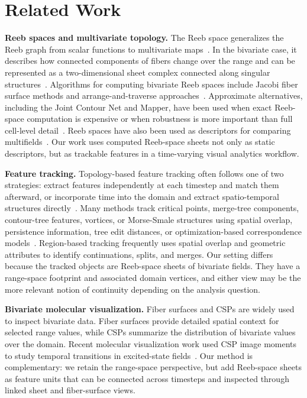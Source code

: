 \documentclass{vgtc}
\newcommand{\myparagraph}[1]{\vspace{1mm} \noindent \textbf{#1}}
\begin{document}
\section{Related Work}

\myparagraph{Reeb spaces and multivariate topology.}
The Reeb space generalizes the Reeb graph from scalar functions to multivariate maps~\cite{Edelsbrunner2008}. In the bivariate case, it describes how connected components of fibers change over the range and can be represented as a two-dimensional sheet complex connected along singular structures~\cite{Edelsbrunner2004b}. Algorithms for computing bivariate Reeb spaces include Jacobi fiber surface methods and arrange-and-traverse approaches~\cite{Tierny2017,Hristov2026SingularAA}. Approximate alternatives, including the Joint Contour Net and Mapper, have been used when exact Reeb-space computation is expensive or when robustness is more important than full cell-level detail~\cite{Carr2014,Dey2016,Brown2021}. Reeb spaces have also been used as descriptors for comparing multifields~\cite{Ramamurthi2022a,Agarwal2021,Ramamurthi2024}. Our work uses computed Reeb-space sheets not only as static descriptors, but as trackable features in a time-varying visual analytics workflow.

\myparagraph{Feature tracking.}
Topology-based feature tracking often follows one of two strategies: extract features independently at each timestep and match them afterward, or incorporate time into the domain and extract spatio-temporal structures directly~\cite{Post2003,Weber2011}. Many methods track critical points, merge-tree components, contour-tree features, vortices, or Morse-Smale structures using spatial overlap, persistence information, tree edit distances, or optimization-based correspondence models~\cite{Samtaney1994,silver1998tracking,Reininghaus2011,Sridharamurthy2020,Wetzels2022a,Wetzels2023}. Region-based tracking frequently uses spatial overlap and geometric attributes to identify continuations, splits, and merges. Our setting differs because the tracked objects are Reeb-space sheets of bivariate fields. They have a range-space footprint and associated domain vertices, and either view may be the more relevant notion of continuity depending on the analysis question.

\myparagraph{Bivariate molecular visualization.}
Fiber surfaces and CSPs are widely used to inspect bivariate data. Fiber surfaces provide detailed spatial context for selected range values, while CSPs summarize the distribution of bivariate values over the domain. Recent molecular visualization work used CSP image moments to study temporal transitions in excited-state fields~\cite{Sharma2025}. Our method is complementary: we retain the range-space perspective, but add Reeb-space sheets as feature units that can be connected across timesteps and inspected through linked sheet and fiber-surface views.
\end{document}
